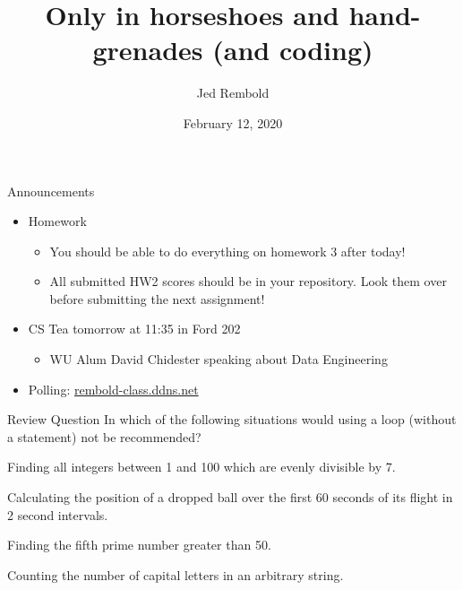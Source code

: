 \documentclass[pdf, aspectratio=169, 12pt]{beamer}
\title{Only in horseshoes and hand-grenades (and coding)}
\author{Jed Rembold}
\date{February 12, 2020}
\begin{document}
\begin{frame}{Announcements}
	\begin{itemize}
		\item Homework 
			\begin{itemize}
				\item You should be able to do everything on homework 3 after today!
				\item All submitted HW2 scores should be in your repository. Look them over before submitting the next assignment!
			\end{itemize}
		\item CS Tea tomorrow at 11:35 in Ford 202
			\begin{itemize}
				\item WU Alum David Chidester speaking about Data Engineering
			\end{itemize}
		\item Polling: \url{rembold-class.ddns.net}
	\end{itemize}
\end{frame}

\begin{frame}{Review Question}
	In which of the following situations would using a  loop (without a  statement) \alert{not} be recommended?
	\begin{poll}
	\item Finding all integers between 1 and 100 which are evenly divisible by 7.
	\item Calculating the position of a dropped ball over the first 60 seconds of its flight in 2 second intervals.
	\item Finding the fifth prime number greater than 50.
	\item Counting the number of capital letters in an arbitrary string.
	\end{poll}
\end{frame}
\end{document}
